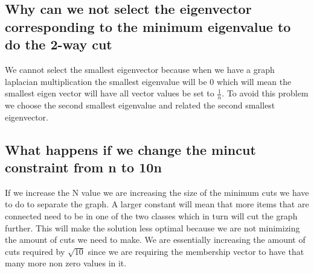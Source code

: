 \documentclass[11pt]{article}
\begin{document}
\subsection{Why can we not select the eigenvector corresponding to the minimum eigenvalue to do the 2-way cut}
We cannot select the smallest eigenvector because when we have a graph laplacian multiplication the smallest eigenvalue will be 0 which will mean the smallest eigen vector will have all vector values be set to $\frac{1}{n}$. To avoid this problem we choose the second smallest eigenvalue and related the second smallest eigenvector.
\subsection{What happens if we change the mincut constraint from n to 10n}
If we increase the N value we are increasing the size of the minimum cuts we have to do to separate the graph. A larger constant will mean that more items that are connected need to be in one of the two classes which in turn will cut the graph further. This will make the solution less optimal because we are not minimizing the amount of cuts we need to make. We are essentially increasing the amount of cuts required by $\sqrt{10}$ since we are requiring the membership vector to have that many more non zero values in it. 
\end{document}
